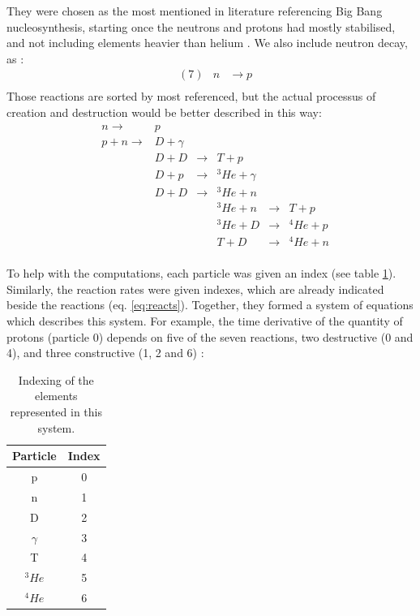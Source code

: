 \documentclass[a4paper, 12pt]{article}
\begin{document}
They were chosen as the most mentioned in literature referencing Big Bang nucleosynthesis, starting once the neutrons and protons had mostly stabilised, and not including elements heavier than helium \parencite{baring_big_2024,ryan_big_2008,navas_review_2024}. We also include neutron decay, as :
\begin{align*}
    &(7)    &n &\rightarrow p\\
\end{align*}
Those reactions are sorted by most referenced, but the actual processus of creation and destruction would be better described in this way:
\begin{align*}
    & n \rightarrow   & p        &             &             &             &\\
    & p+n \rightarrow & D+\gamma &             &             &             &\\
    &                 & D+D      & \rightarrow & T+p         &             &\\
    &                 & D+p      & \rightarrow & ^3He+\gamma &             &\\
    &                 & D+D      & \rightarrow & ^3He+n      &             &\\
    &                 &          &             & ^3He+n      & \rightarrow & T+p\\
    &                 &          &             & ^3He+D      & \rightarrow & ^4He+p\\
    &                 &          &             & T+D         & \rightarrow & ^4He+n\\
\end{align*}

To help with the computations, each particle was given an index (see table \ref{tab:elems}). Similarly, the reaction rates were given indexes, which are already indicated beside the reactions (eq. \ref{eq:reacts}). Together, they formed a system of equations which describes this system. For example, the time derivative of the quantity of protons (particle 0) depends on five of the seven reactions, two destructive (0 and 4), and three constructive (1, 2 and 6) : 

\begin{table}[ht!]
    \centering
    \begin{tabular}{c | c}
        Particle & Index\\
        \hline
        p & 0\\
        n & 1\\
        D & 2\\
        $\gamma$ & 3\\
        T & 4\\
        $^3He$ & 5\\
        $^4He$ & 6\\
    \end{tabular}
    \caption{Indexing of the elements represented in this system.}
    \label{tab:elems}
\end{table}
\end{document}

